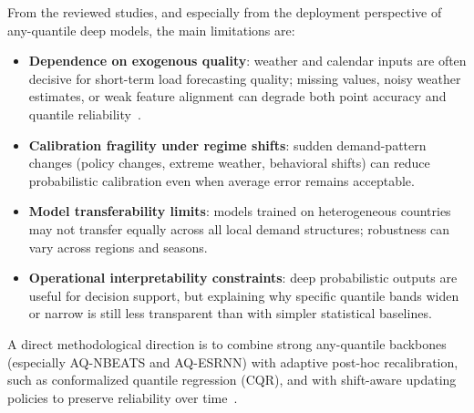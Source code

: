 From the reviewed studies, and especially from the deployment perspective of any-quantile deep models, the main limitations are:
\begin{itemize}
    \item \textbf{Dependence on exogenous quality}: weather and calendar inputs are often decisive for short-term load forecasting quality; missing values, noisy weather estimates, or weak feature alignment can degrade both point accuracy and quantile reliability~\cite{hong2016probabilistic}.
    \item \textbf{Calibration fragility under regime shifts}: sudden demand-pattern changes (policy changes, extreme weather, behavioral shifts) can reduce probabilistic calibration even when average error remains acceptable.
    \item \textbf{Model transferability limits}: models trained on heterogeneous countries may not transfer equally across all local demand structures; robustness can vary across regions and seasons.
    \item \textbf{Operational interpretability constraints}: deep probabilistic outputs are useful for decision support, but explaining why specific quantile bands widen or narrow is still less transparent than with simpler statistical baselines.
\end{itemize}

A direct methodological direction is to combine strong any-quantile backbones (especially AQ-NBEATS and AQ-ESRNN) with adaptive post-hoc recalibration, such as conformalized quantile regression (CQR), and with shift-aware updating policies to preserve reliability over time~\cite{romano2019cqr}.
